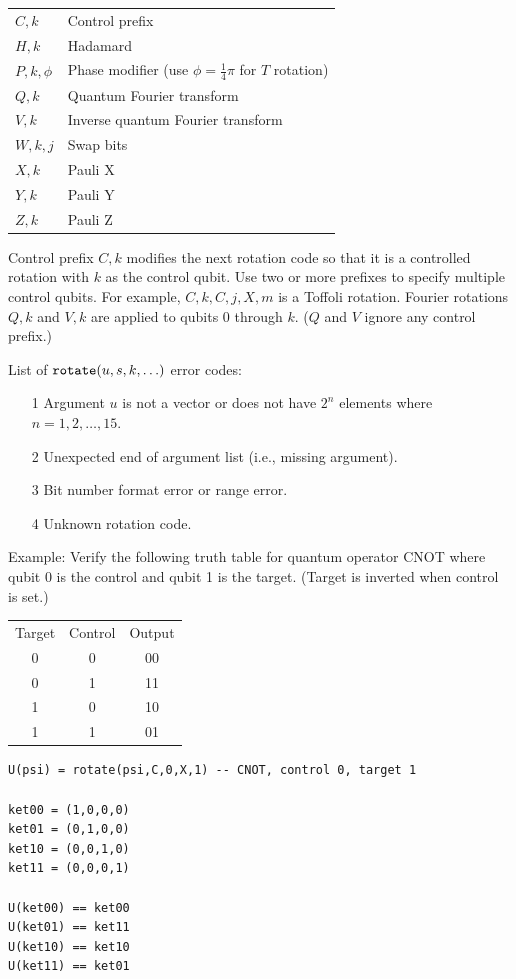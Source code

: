 \documentclass[12pt]{article}
\begin{document}
\begin{center}
\begin{tabular}{ll}
$C,k$ & Control prefix
\\
$H,k$ & Hadamard
\\
$P,k,\phi$ & Phase modifier (use $\phi=\tfrac{1}{4}\pi$ for $T$ rotation)
\\
$Q,k$ & Quantum Fourier transform
\\
$V,k$ & Inverse quantum Fourier transform
\\
$W,k,j$ & Swap bits
\\
$X,k$ & Pauli X
\\
$Y,k$ & Pauli Y
\\
$Z,k$ & Pauli Z
\end{tabular}
\end{center}

Control prefix $C,k$ modifies the next rotation code so that it
is a controlled rotation with $k$ as the control qubit.
Use two or more prefixes to specify multiple control qubits.
For example, $C,k,C,j,X,m$ is a Toffoli rotation.
Fourier rotations $Q,k$ and $V,k$ are applied to qubits 0 through $k$.
($Q$ and $V$ ignore any control prefix.)

\bigskip
List of $\text{\tt rotate}(u,s,k,\ldots)$ error codes:
\begin{itemize}
\item[1] Argument $u$ is not a vector or does not have $2^n$ elements where $n=1,2,\ldots,15$.
\item[2] Unexpected end of argument list (i.e., missing argument).
\item[3] Bit number format error or range error.
\item[4] Unknown rotation code.
\end{itemize}

Example:
Verify the following truth table for quantum operator CNOT
where qubit 0 is the control and qubit 1 is the target.
(Target is inverted when control is set.)
\begin{center}
\begin{tabular}{ccc}
Target & Control & Output \\
0 & 0 & 00 \\
0 & 1 & 11 \\
1 & 0 & 10 \\
1 & 1 & 01
\end{tabular}
\end{center}

{\color{blue}
\begin{verbatim}
U(psi) = rotate(psi,C,0,X,1) -- CNOT, control 0, target 1

ket00 = (1,0,0,0)
ket01 = (0,1,0,0)
ket10 = (0,0,1,0)
ket11 = (0,0,0,1)

U(ket00) == ket00
U(ket01) == ket11
U(ket10) == ket10
U(ket11) == ket01
\end{verbatim}
}
\end{document}
